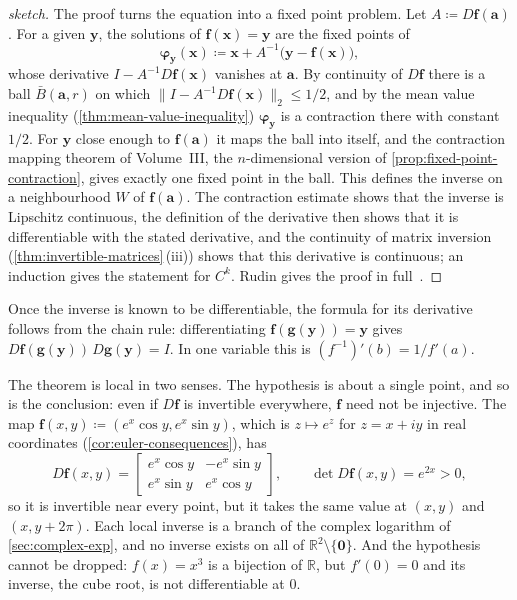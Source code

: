 \begin{proof}[sketch]
The proof turns the equation into a fixed point problem. Let $A\coloneqq D\mathbf f(\mathbf a)$. For a given $\mathbf y$, the solutions of $\mathbf f(\mathbf x)=\mathbf y$ are the fixed points of
\[
\boldsymbol\varphi_{\mathbf y}(\mathbf x)\coloneqq\mathbf x+A^{-1}\bigl(\mathbf y-\mathbf f(\mathbf x)\bigr),
\]
whose derivative $I-A^{-1}D\mathbf f(\mathbf x)$ vanishes at $\mathbf a$. By continuity of $D\mathbf f$ there is a ball $\bar B(\mathbf a,r)$ on which $\|I-A^{-1}D\mathbf f(\mathbf x)\|_2\le1/2$, and by the mean value inequality (\cref{thm:mean-value-inequality}) $\boldsymbol\varphi_{\mathbf y}$ is a contraction there with constant $1/2$. For $\mathbf y$ close enough to $\mathbf f(\mathbf a)$ it maps the ball into itself, and the contraction mapping theorem of Volume~III, the $n$-dimensional version of \cref{prop:fixed-point-contraction}, gives exactly one fixed point in the ball. This defines the inverse on a neighbourhood $W$ of $\mathbf f(\mathbf a)$. The contraction estimate shows that the inverse is Lipschitz continuous, the definition of the derivative then shows that it is differentiable with the stated derivative, and the continuity of matrix inversion (\cref{thm:invertible-matrices}\,(iii)) shows that this derivative is continuous; an induction gives the statement for $C^k$. Rudin gives the proof in full~\cite[Thm.~9.24]{rudin1976}.
\end{proof}

Once the inverse is known to be differentiable, the formula for its derivative follows from the chain rule: differentiating $\mathbf f(\mathbf g(\mathbf y))=\mathbf y$ gives $D\mathbf f(\mathbf g(\mathbf y))\,D\mathbf g(\mathbf y)=I$. In one variable this is $(f^{-1})'(b)=1/f'(a)$.

The theorem is local in two senses. The hypothesis is about a single point, and so is the conclusion: even if $D\mathbf f$ is invertible everywhere, $\mathbf f$ need not be injective. The map $\mathbf f(x,y)\coloneqq(e^x\cos y,e^x\sin y)$, which is $z\mapsto e^z$ for $z=x+iy$ in real coordinates (\cref{cor:euler-consequences}), has
\[
D\mathbf f(x,y)=\begin{bmatrix}e^x\cos y&-e^x\sin y\\e^x\sin y&e^x\cos y\end{bmatrix},\qquad\det D\mathbf f(x,y)=e^{2x}>0 ,
\]
so it is invertible near every point, but it takes the same value at $(x,y)$ and $(x,y+2\pi)$. Each local inverse is a branch of the complex logarithm of \cref{sec:complex-exp}, and no inverse exists on all of $\mathbb R^2\setminus\{\mathbf0\}$. And the hypothesis cannot be dropped: $f(x)=x^3$ is a bijection of $\mathbb R$, but $f'(0)=0$ and its inverse, the cube root, is not differentiable at $0$.

